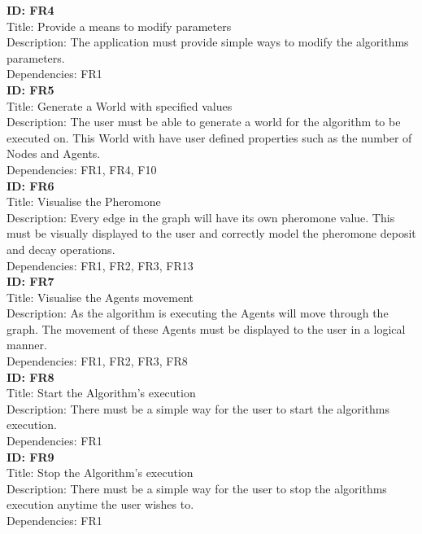 \noindent
\textbf{ID: FR4}\\
Title: Provide a means to modify parameters\\
Description: The application must provide simple ways to modify the algorithms parameters.\\
Dependencies: FR1
\\

\noindent
\textbf{ID: FR5}\\
Title: Generate a World with specified values\\
Description: The user must be able to generate a world for the algorithm to be executed on. This World with have user defined properties such as the number of Nodes and Agents.\\
Dependencies: FR1, FR4, F10
\\

\noindent
\textbf{ID: FR6}\\
Title: Visualise the Pheromone\\
Description: Every edge in the graph will have its own pheromone value. This must be visually displayed to the user and correctly model the pheromone deposit and decay operations.\\
Dependencies: FR1, FR2, FR3, FR13
\\

\noindent
\textbf{ID: FR7}\\
Title: Visualise the Agents movement\\
Description: As the algorithm is executing the Agents will move through the graph. The movement of these Agents must be displayed to the user in a logical manner.\\
Dependencies: FR1, FR2, FR3, FR8
\\

\noindent
\textbf{ID: FR8}\\
Title: Start the Algorithm's execution\\
Description: There must be a simple way for the user to start the algorithms execution. \\
Dependencies: FR1
\\

\noindent
\textbf{ID: FR9}\\
Title: Stop the Algorithm's execution\\
Description: There must be a simple way for the user to stop the algorithms execution anytime the user wishes to. \\
Dependencies: FR1
\\

